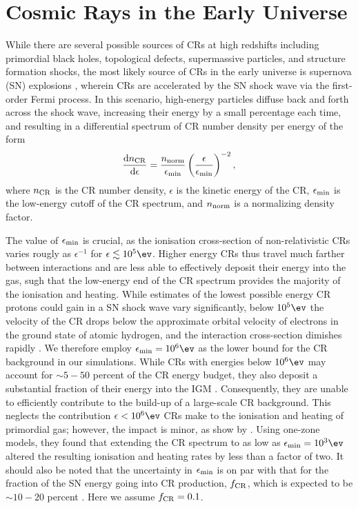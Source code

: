 \section{Cosmic Rays in the Early Universe}
\label{sec:context}
While there are several possible sources of CRs at high redshifts including primordial black holes, topological defects, supermassive particles, and structure formation shocks, the most likely source of CRs in the early universe is supernova (SN) explosions \citep[e.g.,][]{GinzburgSyrovatskii1969,BiermannSigl2001,Stanev2004,Pfrommeretal2006}, wherein CRs are accelerated by the SN shock wave via the first-order Fermi process.  In this scenario, high-energy particles diffuse back and forth across the shock wave, increasing their energy by a small percentage each time, and resulting in a differential spectrum of CR number density per energy \citep{Longair1994} of the form
\begin{equation}
    \frac{{\rm d}n_{\rm \small CR}}{{\rm d}\epsilon} = \frac{n_{\rm norm}}{\epsilon_{\rm min}}
    \left( \frac{\epsilon}{\epsilon_{\rm min}} \right)^{-2},
\end{equation}
where $n_{\rm \small CR}$ is the CR number density, $\epsilon$ is the kinetic energy of the CR, $\epsilon_{\rm min}$ is the low-energy cutoff of the CR spectrum, and $n_{\rm norm}$ is a normalizing density factor. 

The value of $\epsilon_{\rm min}$ is crucial, as the ionisation cross-section of non-relativistic CRs varies rougly as $\epsilon^{-1}$ for $\epsilon \lesssim 10^5\ev$. Higher energy CRs thus travel much farther between interactions and are less able to effectively deposit their energy into the gas, sugh that the low-energy end of the CR spectrum provides the majority of the ionisation and heating.  While estimates of the lowest possible energy CR protons could gain in a SN shock wave vary significantly, below $10^5\ev$ the velocity of the CR drops below the approximate orbital velocity of electrons in the ground state of atomic hydrogen, and the interaction cross-section dimishes rapidly \citep{Schlickeiser2002}. We therefore employ $\epsilon_{\rm min} = 10^6\ev$ as the lower bound for the CR background in our simulations.  While CRs with energies below $10^6\ev$ may account for $\sim$$5-50$ percent of the CR energy budget, they also deposit a substantial fraction of their energy into the IGM \citep{SazonovSunyaev2015}. Consequently, they are unable to efficiently contribute to the build-up of a large-scale CR background. This neglects the contribution $\epsilon < 10^6\ev$ CRs make to the ionisation and heating of primordial gas; however, the impact is minor, as show by \citet{StacyBromm2007}. Using one-zone models, they found that extending the CR spectrum to as low as $\epsilon_{\rm min} = 10^3\ev$ altered the resulting ionisation and heating rates by less than a factor of two.  It should also be noted that the uncertainty in $\epsilon_{\rm min}$ is on par with that for the fraction of the SN energy going into CR production, $f_{\rm \small CR}$, which is expected to be $\sim$$10-20$ percent \citep{CaprioliSpitkovsky2014}.  Here we assume $f_{\rm \small CR} = 0.1$.

